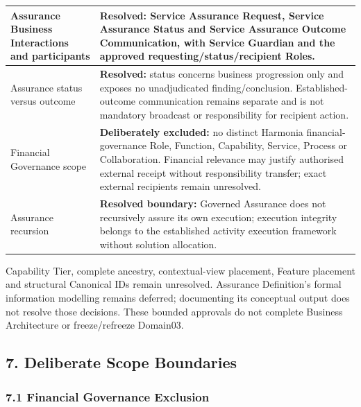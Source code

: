 \begin{longtable}{|>{\raggedright\arraybackslash}p{0.35\TableWidth}|>{\raggedright\arraybackslash}p{0.65\TableWidth}|}
Assurance Business Interactions and participants & \textbf{Resolved:} Service Assurance Request, Service Assurance Status and Service Assurance Outcome Communication, with Service Guardian and the approved requesting/\allowbreak{}status/\allowbreak{}recipient Roles.\\\hline
Assurance status versus outcome & \textbf{Resolved:} status concerns business progression only and exposes no unadjudicated finding/\allowbreak{}conclusion. Established-outcome communication remains separate and is not mandatory broadcast or responsibility for recipient action.\\\hline
Financial Governance scope & \textbf{Deliberately excluded:} no distinct Harmonia financial-governance Role, Function, Capability, Service, Process or Collaboration. Financial relevance may justify authorised external receipt without responsibility transfer; exact external recipients remain unresolved.\\\hline
Assurance recursion & \textbf{Resolved boundary:} Governed Assurance does not recursively assure its own execution; execution integrity belongs to the established activity execution framework without solution allocation.\\\hline
\end{longtable}\endgroup
{}\label{rad:assurance:245}

Capability Tier, complete ancestry, contextual-view placement, Feature placement and structural Canonical IDs remain unresolved. Assurance Definition's formal information modelling remains deferred; documenting its conceptual output does not resolve those decisions. These bounded approvals do not complete Business Architecture or freeze/\allowbreak{}refreeze Domain03.

\label{rad:assurance:247}
\subsection*{7. Deliberate Scope Boundaries}
\label{rad:assurance:249}



\label{rad:assurance:251}
\subsubsection*{7.1 Financial Governance Exclusion}
\label{rad:assurance:253}

